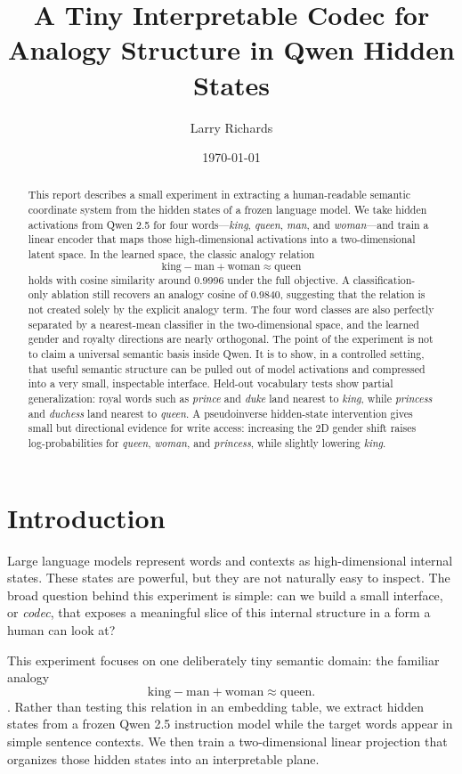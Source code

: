 \documentclass[11pt]{article}
\title{A Tiny Interpretable Codec for Analogy Structure in Qwen Hidden States}
\author{Larry Richards}
\date{\today}
\begin{document}
\maketitle

\begin{abstract}
This report describes a small experiment in extracting a human-readable semantic
coordinate system from the hidden states of a frozen language model. We take
hidden activations from Qwen 2.5 for four words---\emph{king}, \emph{queen},
\emph{man}, and \emph{woman}---and train a linear encoder that maps those
high-dimensional activations into a two-dimensional latent space. In the learned
space, the classic analogy relation
\[
  \mathrm{king} - \mathrm{man} + \mathrm{woman} \approx \mathrm{queen}
\]
holds with cosine similarity around 0.9996 under the full objective. A
classification-only ablation still recovers an analogy cosine of 0.9840,
suggesting that the relation is not created solely by the explicit analogy
term. The four word classes are also perfectly separated by a nearest-mean
classifier in the two-dimensional space, and the learned gender and royalty
directions are nearly orthogonal. The point of the experiment is not to claim a
universal semantic basis inside Qwen. It is to show, in a controlled setting,
that useful semantic structure can be pulled out of model activations and
compressed into a very small, inspectable interface. Held-out vocabulary tests
show partial generalization:
royal words such as \emph{prince} and \emph{duke} land nearest to \emph{king},
while \emph{princess} and \emph{duchess} land nearest to \emph{queen}. A
pseudoinverse hidden-state intervention gives small but directional evidence
for write access: increasing the 2D gender shift raises log-probabilities for
\emph{queen}, \emph{woman}, and \emph{princess}, while slightly lowering
\emph{king}.
\end{abstract}

\section{Introduction}

Large language models represent words and contexts as high-dimensional internal
states. These states are powerful, but they are not naturally easy to inspect.
The broad question behind this experiment is simple: can we build a small
interface, or \emph{codec}, that exposes a meaningful slice of this internal
structure in a form a human can look at?

This experiment focuses on one deliberately tiny semantic domain: the familiar
analogy
\[
  \mathrm{king} - \mathrm{man} + \mathrm{woman} \approx \mathrm{queen}.
\] \cite{mikolov2013analogies}.
Rather than testing this relation in an embedding table, we extract hidden
states from a frozen Qwen 2.5 instruction model \cite{qwen2024} while the
target words appear in simple sentence contexts. We then train a
two-dimensional linear projection that organizes those hidden states into an
interpretable plane.
\end{document}
